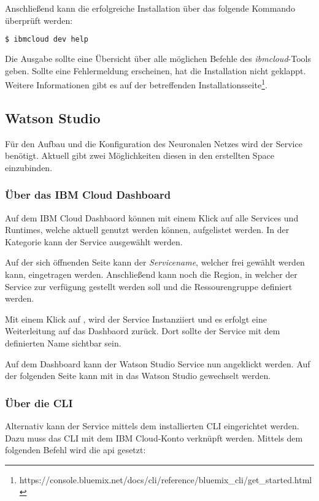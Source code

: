 Anschließend kann die erfolgreiche Installation über das folgende Kommando überprüft werden:

\begin{lstlisting}[language=bash, caption=Installation des CLI überprüfen, label=Installation des CLI überprüfen]
    $ ibmcloud dev help
\end{lstlisting}

Die Ausgabe sollte eine Übersicht über alle möglichen Befehle des \textit{ibmcloud}-Tools geben. Sollte eine Fehlermeldung
erscheinen, hat die Installation nicht geklappt. Weitere Informationen gibt es auf der betreffenden
Installationsseite\footnote{https://console.bluemix.net/docs/cli/reference/bluemix\_cli/get\_started.html}.

\subsection{Watson Studio}
Für den Aufbau und die Konfiguration des Neuronalen Netzes wird der Service  benötigt. Aktuell gibt
zwei Möglichkeiten diesen in den erstellten Space einzubinden.

\subsubsection*{Über das IBM Cloud Dashboard}
Auf dem IBM Cloud Dashbaord können mit einem Klick auf  alle Services und Runtimes, welche aktuell genutzt
werden können, aufgelistet werden. In der Kategorie  kann der Service 
ausgewählt werden.

Auf der sich öffnenden Seite kann der \textit{Servicename}, welcher frei gewählt werden kann, eingetragen werden. Anschließend
kann noch die Region, in welcher der Service zur verfügung gestellt werden soll und die Ressourengruppe definiert werden.

Mit einem Klick auf , wird der Service Instanziiert und es erfolgt eine Weiterleitung auf das Dashbaord
zurück. Dort sollte der Service mit dem definierten Name sichtbar sein.

Auf dem Dashboard kann der Watson Studio Service nun angeklickt werden. Auf der folgenden Seite kann mit 
in das Watson Studio gewechselt werden.

\subsubsection*{Über die CLI}
Alternativ kann der Service mittels dem installierten CLI eingerichtet werden. Dazu muss das CLI mit dem IBM
Cloud-Konto verknüpft werden. Mittels dem folgenden Befehl wird die api gesetzt:

